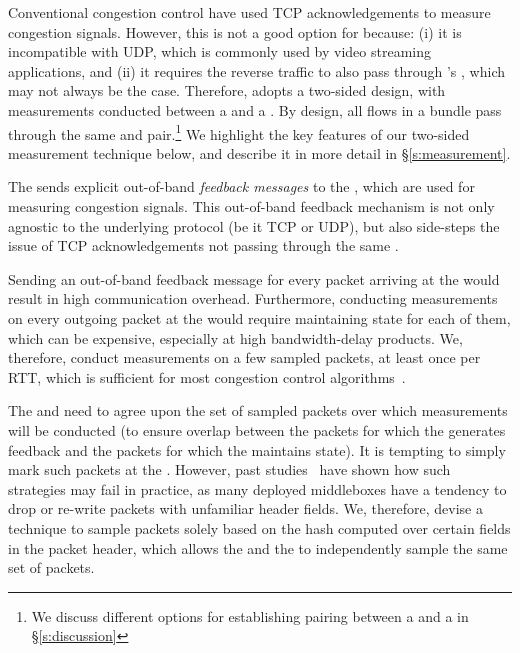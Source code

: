 \label{s:design:twosided}
Conventional congestion control  have used TCP acknowledgements to measure congestion signals. However, this is not a good option for \name because: (i) it is incompatible with UDP, which is commonly used by video streaming applications, and (ii) it requires the reverse traffic to also pass through \name's \inbox, which may not always be the case.  
Therefore, \name adopts a two-sided design, with measurements conducted between a \inbox and a \outbox. By design, all flows in a bundle pass through the same \inbox and \outbox pair.\footnote{We discuss different options for establishing pairing between a \inbox and a \outbox in \S\ref{s:discussion}} We highlight the key features of our two-sided measurement technique below, and describe it in more detail in \S\ref{s:measurement}. 

The \outbox sends explicit out-of-band \emph{feedback messages} to the \inbox, which are used for measuring congestion signals. 
This out-of-band feedback mechanism is not only agnostic to the underlying protocol (be it TCP or UDP), but also side-steps the issue of TCP acknowledgements not passing through the same \inbox.

 Sending an out-of-band feedback message for every packet arriving at the \outbox would result in high communication overhead. Furthermore, conducting measurements on every outgoing packet at the \inbox would require maintaining state for each of them, which can be expensive, especially at high bandwidth-delay products. We, therefore, conduct measurements on a few sampled packets, at least once per RTT, which is sufficient for most congestion control algorithms~\cite{ccp}. 

 The \inbox and \outbox need to agree upon the set of sampled packets over which measurements will be conducted (to ensure overlap between the packets for which the \outbox generates feedback and the packets for which the \inbox maintains state). It is tempting to simply mark such packets at the \inbox. However, past studies~\cite{ipoptions, mboxbadness, quic} have shown how such strategies may fail in practice, as many deployed middleboxes have a tendency to drop or re-write packets with unfamiliar header fields. 
We, therefore, devise a technique to sample packets solely based on the hash computed over certain fields in the packet header, which allows the \inbox and the \outbox to independently sample the same set of packets.


